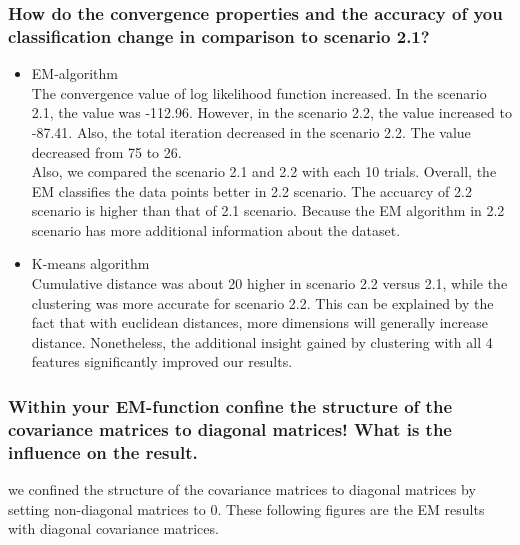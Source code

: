 \documentclass[a4paper]{article}
\begin{document}
\clearpage

	\subsubsection{How do the convergence properties and the accuracy of you classification change in comparison to scenario 2.1? }
	\begin{itemize}
		\item EM-algorithm \\
		The convergence value of log likelihood function increased. In the scenario 2.1, the value was -112.96. However, in the scenario 2.2, the value increased to -87.41. Also, the total iteration decreased in the scenario 2.2. The value decreased from 75 to 26.\\
		Also, we compared the scenario 2.1 and 2.2 with each 10 trials. Overall, the EM classifies the data points better in 2.2 scenario. The accuarcy of 2.2 scenario is higher than that of 2.1 scenario. Because the EM algorithm in 2.2 scenario has more additional information about the dataset.

		\item K-means algorithm \\
		Cumulative distance was about 20 higher in scenario 2.2 versus 2.1, while the clustering was more accurate for scenario 2.2.  This can be explained by the fact that with euclidean distances, more dimensions will generally increase distance.  Nonetheless, the additional insight gained by clustering with all 4 features significantly improved our results.

	\end{itemize}

	\clearpage
	\subsubsection{Within your EM-function confine the structure of the covariance matrices to diagonal matrices! What is the inﬂuence on the result.}
	we confined the structure of the covariance matrices to diagonal matrices by setting non-diagonal matrices to 0. These following figures are the EM results with diagonal covariance matrices.
\end{document}
